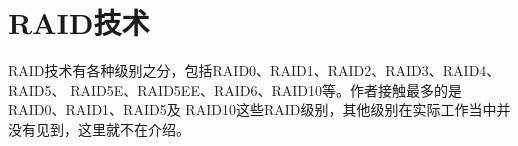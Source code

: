 





\chapter{RAID技术}

RAID技术有各种级别之分，包括RAID0、RAID1、RAID2、RAID3、RAID4、RAID5、
RAID5E、RAID5EE、RAID6、RAID10等。作者接触最多的是RAID0、RAID1、RAID5及
RAID10这些RAID级别，其他级别在实际工作当中并没有见到，这里就不在介绍。

